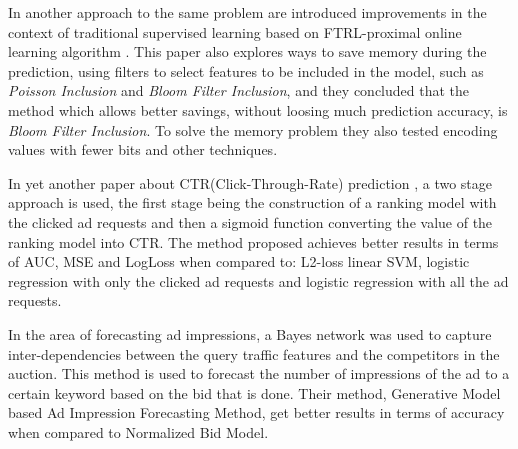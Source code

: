 In another approach to the same problem are introduced improvements in the
context of traditional supervised learning based on FTRL-proximal online
learning algorithm \cite{McMahan:2013:ACP:2487575.2488200}. This paper also
explores ways to save memory during the prediction, using filters to select
features to be included in the model, such as \emph{Poisson Inclusion} and
\emph{Bloom Filter Inclusion}, and they concluded that the method which allows
better savings, without loosing much prediction accuracy, is \emph{Bloom Filter
Inclusion}. To solve the memory problem they also tested encoding values with
fewer bits and other techniques.

In yet another paper about CTR(Click-Through-Rate) prediction
\cite{Tagami:2013:CPC:2501040.2501978}, a two stage approach is used, the first
stage being the construction of a ranking model with the clicked ad requests and
then a sigmoid function converting the value of the ranking model into CTR. The
method proposed achieves better results in terms of AUC, MSE and LogLoss when
compared to: L2-loss linear SVM, logistic regression with only the clicked ad
requests and logistic regression with all the ad requests.

In the area of forecasting ad impressions, a Bayes network was used to capture
inter-dependencies between the query traffic features and the competitors in the
auction\cite{nath2013ad}. This method is used to forecast the number of
impressions of the ad to a certain keyword based on the bid that is done. Their
method, Generative Model based Ad Impression Forecasting Method, get better
results in terms of accuracy when compared to Normalized Bid Model. 
